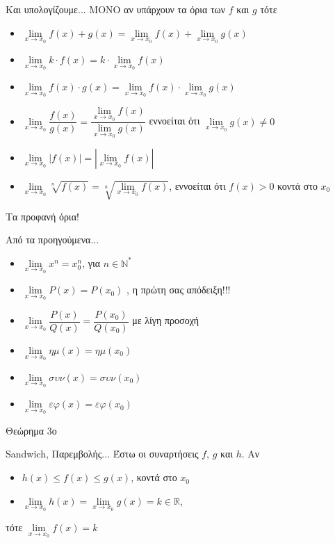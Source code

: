 \documentclass[greek]{beamer}
\begin{document}
\begin{frame}{Και υπολογίζουμε...}
  ΜΟΝΟ αν υπάρχουν τα όρια των $f$ και $g$ τότε
  \begin{itemize}
    \item $\lim\limits_{x \to x_0}{ f(x)+g(x) }=\lim\limits_{x \to x_0}{ f(x) }+\lim\limits_{x \to x_0}{ g(x) }$
    \item $\lim\limits_{x \to x_0}{ k\cdot f(x) }=k\cdot \lim\limits_{x \to x_0}{ f(x) }$
    \item $\lim\limits_{x \to x_0}{ f(x)\cdot g(x) }=\lim\limits_{x \to x_0}{ f(x) }\cdot\lim\limits_{x \to x_0}{ g(x) }$
    \item $\lim\limits_{x \to x_0}{ \dfrac{f(x)}{g(x)} }=\dfrac{\lim\limits_{x \to x_0}{ f(x) }}{\lim\limits_{x \to x_0}{ g(x) }}$ εννοείται ότι $\lim\limits_{x \to x_0}{ g(x) }\ne 0$
    \item $\lim\limits_{x \to x_0}{ |f(x)| }=|\lim\limits_{x \to x_0}{ f(x) }|$
    \item $\lim\limits_{x \to x_0}{ \sqrt[n]{f(x)} }=\sqrt[n]{\lim\limits_{x \to x_0}{ f(x) }}$, εννοείται ότι $f(x)>0$ κοντά στο $x_0$
  \end{itemize}
\end{frame}

\begin{frame}{Τα προφανή όρια!}
  \begin{block}{Από τα προηγούμενα...}
    \begin{itemize}
      \item $\lim\limits_{x \to x_0}{ x^n }=x_0^n$, για $n\in \mathbb{N}^*$ \pause
      \item $\lim\limits_{x \to x_0}{ P(x) }=P(x_0)$ \pause, η πρώτη σας απόδειξη!!! \pause
      \item $\lim\limits_{x \to x_0}{ \dfrac{P(x)}{Q(x)} }=\dfrac{P(x_0)}{Q(x_0)}$ \pause με λίγη προσοχή \pause
      \item $\lim\limits_{x \to x_0}{ ημ(x) }=ημ(x_0)$ \pause
      \item $\lim\limits_{x \to x_0}{ συν(x) }=συν(x_0)$ \pause
      \item $\lim\limits_{x \to x_0}{ εφ(x) }=εφ(x_0)$
    \end{itemize}
  \end{block}
\end{frame}

\begin{frame}{Θεώρημα 3ο}
  \begin{block}{Sandwich, Παρεμβολής...}
    Έστω οι συναρτήσεις $f$, $g$ και $h$. Αν
    \begin{itemize}
      \item<1-> $h(x)\le f(x) \le g(x)$, κοντά στο $x_0$
      \item<2-> $\lim\limits_{x \to x_0}{ h(x) }=\lim\limits_{x \to x_0}{ g(x) }=k \in\mathbb{R}$,
    \end{itemize}
    τότε $\lim\limits_{x \to x_0}{ f(x) }=k$
  \end{block}
\end{frame}
\end{document}
